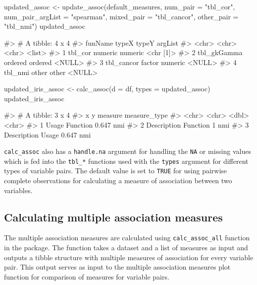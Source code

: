 \begin{Schunk}
\begin{Sinput}
updated_assoc <- update_assoc(default_measures,
                              num_pair = "tbl_cor",
                              num_pair_argList = "spearman",
                              mixed_pair = "tbl_cancor",
                              other_pair = "tbl_nmi")
updated_assoc
\end{Sinput}
\begin{Soutput}
#> # A tibble: 4 x 4
#>   funName     typeX   typeY   argList  
#>   <chr>       <chr>   <chr>   <list>   
#> 1 tbl_cor     numeric numeric <chr [1]>
#> 2 tbl_gkGamma ordered ordered <NULL>   
#> 3 tbl_cancor  factor  numeric <NULL>   
#> 4 tbl_nmi     other   other   <NULL>
\end{Soutput}
\end{Schunk}

\begin{Schunk}
\begin{Sinput}
updated_iris_assoc <- calc_assoc(d = df, 
                                 types = updated_assoc)
updated_iris_assoc
\end{Sinput}
\begin{Soutput}
#> # A tibble: 3 x 4
#>   x           y        measure measure_type
#>   <chr>       <chr>      <dbl> <chr>       
#> 1 Usage       Function   0.647 nmi         
#> 2 Description Function   1     nmi         
#> 3 Description Usage      0.647 nmi
\end{Soutput}
\end{Schunk}

\texttt{calc\_assoc} also has a \texttt{handle.na} argument for handling
the \texttt{NA} or missing values which is fed into the \texttt{tbl\_*}
functions used with the \texttt{types} argument for different types of
variable pairs. The default value is set to \texttt{TRUE} for using
pairwise complete observations for calculating a measure of association
between two variables.

\hypertarget{calculating-multiple-association-measures}{%
\subsection{Calculating multiple association
measures}\label{calculating-multiple-association-measures}}

The multiple association measures are calculated using
\texttt{calc\_assoc\_all} function in the package. The function takes a
dataset and a list of measures as input and outputs a tibble structure
with multiple measures of association for every variable pair. This
output serves as input to the multiple association measures plot
function for comparison of measures for variable pairs.

